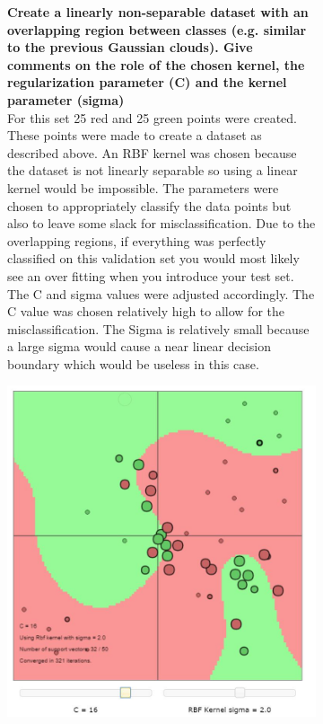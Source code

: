 \documentclass[11pt,oneside,a4paper]{article}
\begin{document}
 \begin{figure}[H]
 	\centering
 	\begin{subfigure}[b]{.5\textwidth}
 		
 	\textbf{Create a linearly non-separable dataset with an overlapping region between classes (e.g. similar to the previous Gaussian clouds). Give comments on the role of the chosen kernel, the regularization parameter (C) and the kernel parameter (sigma)}\\
 	
 		For this set 25 red and 25 green points were created. These points were made to create a dataset as described above. An RBF kernel was chosen because the dataset is not linearly separable so using a linear kernel would be impossible. The parameters were chosen to appropriately classify the data points but also to leave some slack for misclassification. Due to the overlapping regions, if everything was perfectly classified on this validation set you would most likely see an over fitting when you introduce your test set. The C and sigma values were adjusted accordingly. The C value was chosen relatively high to allow for the misclassification. The Sigma is relatively small because a large sigma would cause a near linear decision boundary which would be useless in this case. 
 		
 		
 		
 	\end{subfigure}%
 	\begin{subfigure}{.5\textwidth}
 		\vspace{-185pt}
 		\centering
 		\includegraphics[width=0.9\linewidth]{../Figures/RBF_non_linear_data}
 	\end{subfigure}
 \end{figure}
\end{document}
